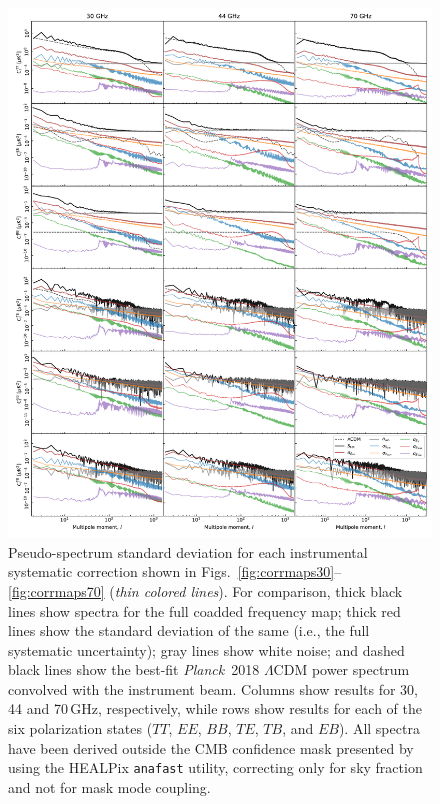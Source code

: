 \documentclass[twocolumn]{../../common/aa}
\def\Planck{\emph{Planck}}
\begin{document}
\begin{figure}
  \center	
  \includegraphics[width=0.98\linewidth]{figures/components_power_spectrum_std_masked.pdf}
  \caption{Pseudo-spectrum standard deviation for each instrumental
    systematic correction shown in
    Figs.~\ref{fig:corrmaps30}--\ref{fig:corrmaps70} (\emph{thin
      colored lines}). For comparison, thick black lines show spectra
    for the full coadded frequency map; thick red lines show the
    standard deviation of the same (i.e., the full systematic
    uncertainty); gray lines show white noise; and dashed black lines
    show the best-fit \Planck\ 2018 $\Lambda$CDM power spectrum
    convolved with the instrument beam. Columns show results for 30,
    44 and 70\,GHz, respectively, while rows show results for each of
    the six polarization states ($TT$, $EE$, $BB$, $TE$, $TB$, and
    $EB$). All spectra have been derived outside the CMB confidence
    mask presented by \citet{bp13} using the HEALPix \texttt{anafast}
    utility, correcting only for sky fraction and not for mask mode
    coupling. }
  \label{fig:corrmap_powspec_stddev}
\end{figure}
\end{document}

